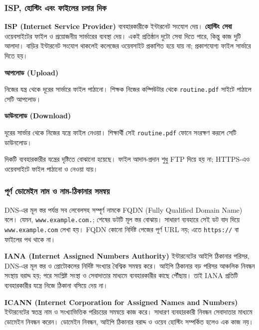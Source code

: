 \subsubsection{ISP, হোস্টিং এবং ফাইলের চলার দিক}
\textbf{ISP (Internet Service Provider)} ব্যবহারকারীকে ইন্টারনেট সংযোগ দেয়। \textbf{হোস্টিং সেবা} ওয়েবসাইটের ফাইল ও প্রয়োজনীয় সার্ভারের ব্যবস্থা দেয়। একই প্রতিষ্ঠান দুটো সেবা দিতে পারে, কিন্তু কাজ দুটি আলাদা। বাড়ির ইন্টারনেট সংযোগ থাকলেই কলেজের ওয়েবসাইট প্রকাশিত হয়ে যায় না; প্রকাশযোগ্য ফাইল সার্ভারে দিতে হয়।

\par\noindent\begin{minipage}[t]{.48\linewidth}\vspace{0pt}\small
\textbf{\color{chFourTeal}আপলোড (Upload)}\par
নিজের যন্ত্র থেকে দূরের সার্ভারে ফাইল পাঠানো। শিক্ষক নিজের কম্পিউটার থেকে \texttt{routine.pdf} সাইটে পাঠালে সেটি আপলোড।
\end{minipage}\hfill
\begin{minipage}[t]{.48\linewidth}\vspace{0pt}\small
\textbf{\color{chFourTeal}ডাউনলোড (Download)}\par
দূরের সার্ভার থেকে নিজের যন্ত্রে ফাইল নেওয়া। শিক্ষার্থী সেই \texttt{routine.pdf} ফোনে সংরক্ষণ করলে সেটি ডাউনলোড।
\end{minipage}\par
দিকটি ব্যবহারকারীর যন্ত্রের দৃষ্টিতে বোঝানো হয়েছে। ফাইল আদান-প্রদান শুধু FTP দিয়ে হয় না; HTTPS-এও ওয়েবসাইটে ফাইল পাঠানো ও নেওয়া যায়।

\subsubsection{পূর্ণ ডোমেইন নাম ও নাম-ঠিকানার সমন্বয়}
DNS-এর মূল স্তর পর্যন্ত সব লেবেলসহ সম্পূর্ণ নামকে FQDN (Fully Qualified Domain Name) বলে। যেমন, \texttt{www.example.com.}; শেষের ডটটি মূল স্তর বোঝায়। সাধারণ ব্যবহারে সেই ডট বাদ দিয়ে \texttt{www.example.com} লেখা হয়। FQDN কোনো নির্দিষ্ট পেজের পূর্ণ URL নয়; এতে \texttt{https://} বা ফাইলের পথ থাকে না।

\textbf{IANA (Internet Assigned Numbers Authority)} ইন্টারনেটের আইপি ঠিকানার পরিসর, DNS-এর মূল স্তর ও প্রোটোকলের নির্দিষ্ট সংখ্যার বৈশ্বিক সমন্বয় করে। আইপি ঠিকানার বড় পরিসর আঞ্চলিক নিবন্ধন সংস্থায় বরাদ্দ হয়; পরে সংশ্লিষ্ট সংস্থা ও সেবাদাতার মাধ্যমে ব্যবহারকারীর কাছে পৌঁছায়। তাই IANA প্রতিটি ব্যবহারকারীর যন্ত্রে নিজে ঠিকানা বসিয়ে দেয় না।

\textbf{ICANN (Internet Corporation for Assigned Names and Numbers)} ইন্টারনেটের স্বতন্ত্র নাম ও সংখ্যাভিত্তিক পরিচয়ের সমন্বয়ে কাজ করে। সাধারণ ব্যবহারকারী নিবন্ধন সেবাদাতার মাধ্যমে ডোমেইন নিবন্ধন করেন। ডোমেইন নিবন্ধন, আইপি ঠিকানার বরাদ্দ ও ওয়েব হোস্টিং সম্পর্কিত হলেও এক কাজ নয়।
